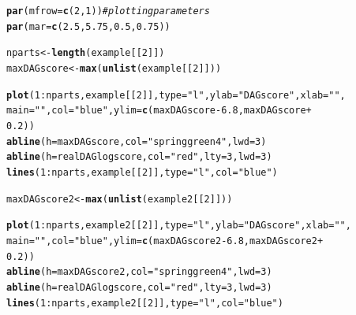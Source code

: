 \documentclass[a4paper]{article}\usepackage[]{graphicx}\usepackage[]{color}
\makeatletter
\newcommand{\hlnum}[1]{\textcolor[rgb]{0.686,0.059,0.569}{#1}}%
\newcommand{\hlstr}[1]{\textcolor[rgb]{0.192,0.494,0.8}{#1}}%
\newcommand{\hlcom}[1]{\textcolor[rgb]{0.678,0.584,0.686}{\textit{#1}}}%
\newcommand{\hlopt}[1]{\textcolor[rgb]{0,0,0}{#1}}%
\newcommand{\hlstd}[1]{\textcolor[rgb]{0.345,0.345,0.345}{#1}}%
\newcommand{\hlkwb}[1]{\textcolor[rgb]{0.69,0.353,0.396}{#1}}%
\newcommand{\hlkwc}[1]{\textcolor[rgb]{0.333,0.667,0.333}{#1}}%
\newcommand{\hlkwd}[1]{\textcolor[rgb]{0.737,0.353,0.396}{\textbf{#1}}}%
\newenvironment{kframe}{%
 \def\at@end@of@kframe{}%
 \ifinner\ifhmode%
  \def\at@end@of@kframe{\end{minipage}}%
  \begin{minipage}{\columnwidth}%
 \fi\fi%
 \def\FrameCommand##1{\hskip\@totalleftmargin \hskip-\fboxsep
 \colorbox{shadecolor}{##1}\hskip-\fboxsep
     \hskip-\linewidth \hskip-\@totalleftmargin \hskip\columnwidth}%
 \MakeFramed {\advance\hsize-\width
   \@totalleftmargin\z@ \linewidth\hsize
   \@setminipage}}%
 {\par\unskip\endMakeFramed%
 \at@end@of@kframe}
\newenvironment{knitrout}{}{} %
\makeatother
\begin{document}
\begin{knitrout}
\color{fgcolor}\begin{kframe}
\begin{alltt}
\hlkwd{par}\hlstd{(}\hlkwc{mfrow} \hlstd{=} \hlkwd{c}\hlstd{(}\hlnum{2}\hlstd{,} \hlnum{1}\hlstd{))}  \hlcom{# plotting parameters}
\hlkwd{par}\hlstd{(}\hlkwc{mar} \hlstd{=} \hlkwd{c}\hlstd{(}\hlnum{2.5}\hlstd{,} \hlnum{5.75}\hlstd{,} \hlnum{0.5}\hlstd{,} \hlnum{0.75}\hlstd{))}

\hlstd{nparts} \hlkwb{<-} \hlkwd{length}\hlstd{(example[[}\hlnum{2}\hlstd{]])}
\hlstd{maxDAGscore} \hlkwb{<-} \hlkwd{max}\hlstd{(}\hlkwd{unlist}\hlstd{(example[[}\hlnum{2}\hlstd{]]))}

\hlkwd{plot}\hlstd{(}\hlnum{1}\hlopt{:}\hlstd{nparts, example[[}\hlnum{2}\hlstd{]],} \hlkwc{type} \hlstd{=} \hlstr{"l"}\hlstd{,} \hlkwc{ylab} \hlstd{=} \hlstr{"DAG score"}\hlstd{,} \hlkwc{xlab} \hlstd{=} \hlstr{""}\hlstd{,}
    \hlkwc{main} \hlstd{=} \hlstr{""}\hlstd{,} \hlkwc{col} \hlstd{=} \hlstr{"blue"}\hlstd{,} \hlkwc{ylim} \hlstd{=} \hlkwd{c}\hlstd{(maxDAGscore} \hlopt{-} \hlnum{6.8}\hlstd{, maxDAGscore} \hlopt{+}
        \hlnum{0.2}\hlstd{))}
\hlkwd{abline}\hlstd{(}\hlkwc{h} \hlstd{= maxDAGscore,} \hlkwc{col} \hlstd{=} \hlstr{"springgreen4"}\hlstd{,} \hlkwc{lwd} \hlstd{=} \hlnum{3}\hlstd{)}
\hlkwd{abline}\hlstd{(}\hlkwc{h} \hlstd{= realDAGlogscore,} \hlkwc{col} \hlstd{=} \hlstr{"red"}\hlstd{,} \hlkwc{lty} \hlstd{=} \hlnum{3}\hlstd{,} \hlkwc{lwd} \hlstd{=} \hlnum{3}\hlstd{)}
\hlkwd{lines}\hlstd{(}\hlnum{1}\hlopt{:}\hlstd{nparts, example[[}\hlnum{2}\hlstd{]],} \hlkwc{type} \hlstd{=} \hlstr{"l"}\hlstd{,} \hlkwc{col} \hlstd{=} \hlstr{"blue"}\hlstd{)}

\hlstd{maxDAGscore2} \hlkwb{<-} \hlkwd{max}\hlstd{(}\hlkwd{unlist}\hlstd{(example2[[}\hlnum{2}\hlstd{]]))}

\hlkwd{plot}\hlstd{(}\hlnum{1}\hlopt{:}\hlstd{nparts, example2[[}\hlnum{2}\hlstd{]],} \hlkwc{type} \hlstd{=} \hlstr{"l"}\hlstd{,} \hlkwc{ylab} \hlstd{=} \hlstr{"DAG score"}\hlstd{,} \hlkwc{xlab} \hlstd{=} \hlstr{""}\hlstd{,}
    \hlkwc{main} \hlstd{=} \hlstr{""}\hlstd{,} \hlkwc{col} \hlstd{=} \hlstr{"blue"}\hlstd{,} \hlkwc{ylim} \hlstd{=} \hlkwd{c}\hlstd{(maxDAGscore2} \hlopt{-} \hlnum{6.8}\hlstd{, maxDAGscore2} \hlopt{+}
        \hlnum{0.2}\hlstd{))}
\hlkwd{abline}\hlstd{(}\hlkwc{h} \hlstd{= maxDAGscore2,} \hlkwc{col} \hlstd{=} \hlstr{"springgreen4"}\hlstd{,} \hlkwc{lwd} \hlstd{=} \hlnum{3}\hlstd{)}
\hlkwd{abline}\hlstd{(}\hlkwc{h} \hlstd{= realDAGlogscore,} \hlkwc{col} \hlstd{=} \hlstr{"red"}\hlstd{,} \hlkwc{lty} \hlstd{=} \hlnum{3}\hlstd{,} \hlkwc{lwd} \hlstd{=} \hlnum{3}\hlstd{)}
\hlkwd{lines}\hlstd{(}\hlnum{1}\hlopt{:}\hlstd{nparts, example2[[}\hlnum{2}\hlstd{]],} \hlkwc{type} \hlstd{=} \hlstr{"l"}\hlstd{,} \hlkwc{col} \hlstd{=} \hlstr{"blue"}\hlstd{)}
\end{alltt}
\end{kframe}


\end{knitrout}
\end{document}
